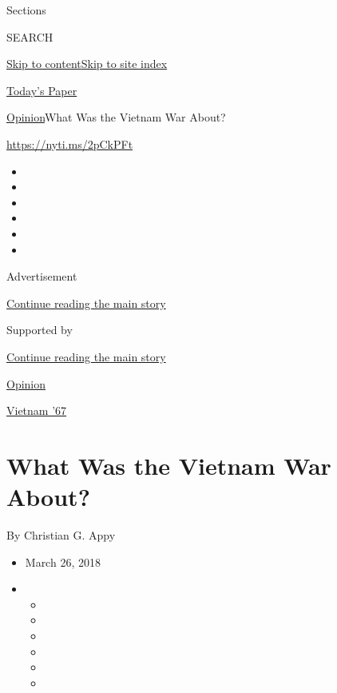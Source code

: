 Sections

SEARCH

\protect\hyperlink{site-content}{Skip to
content}\protect\hyperlink{site-index}{Skip to site index}

\href{https://myaccount.nytimes3xbfgragh.onion/auth/login?response_type=cookie\&client_id=vi}{}

\href{https://www.nytimes3xbfgragh.onion/section/todayspaper}{Today's
Paper}

\href{/section/opinion}{Opinion}\textbar{}What Was the Vietnam War
About?

\url{https://nyti.ms/2pCkPFt}

\begin{itemize}
\item
\item
\item
\item
\item
\item
\end{itemize}

Advertisement

\protect\hyperlink{after-top}{Continue reading the main story}

Supported by

\protect\hyperlink{after-sponsor}{Continue reading the main story}

\href{/section/opinion}{Opinion}

\href{/column/vietnam-67}{Vietnam '67}

\hypertarget{what-was-the-vietnam-war-about}{%
\section{What Was the Vietnam War
About?}\label{what-was-the-vietnam-war-about}}

By Christian G. Appy

\begin{itemize}
\item
  March 26, 2018
\item
  \begin{itemize}
  \item
  \item
  \item
  \item
  \item
  \item
  \end{itemize}
\end{itemize}


